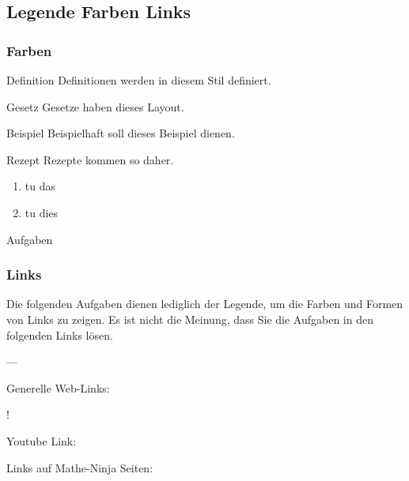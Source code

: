 %
%

\subsection{Legende Farben Links}

\subsubsection{Farben}

\begin{definition}{Definition}{}
  Definitionen werden in diesem Stil definiert.
\end{definition}

\begin{gesetz}{Gesetz}{}
  Gesetze haben dieses Layout.
\end{gesetz}

\begin{beispiel}{Beispiel}{}
  Beispielhaft soll dieses Beispiel dienen.
\end{beispiel}

\begin{rezept}{Rezept}{}
  Rezepte kommen so daher.
  \begin{enumerate}
  \item tu das
  \item tu dies
    \end{enumerate}
\end{rezept}

Aufgaben
\newpage

\subsubsection{Links}

Die folgenden Aufgaben dienen lediglich der Legende, um die Farben und
Formen von Links zu zeigen. Es ist nicht die Meinung, dass Sie die
Aufgaben in den folgenden Links lösen.

---

Generelle Web-Links:

!


Youtube Link:


Links auf Mathe-Ninja Seiten:

